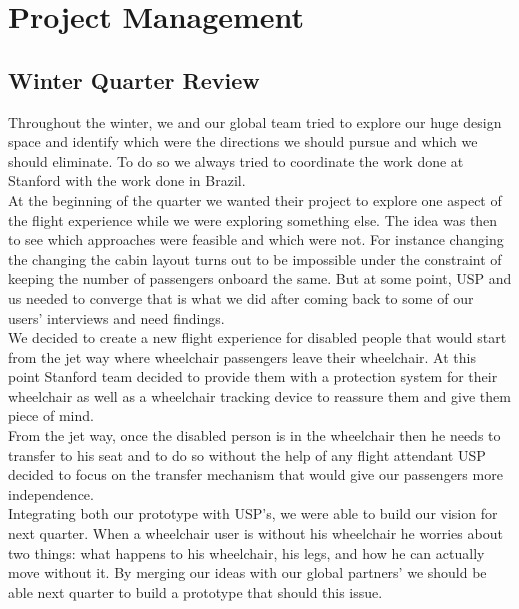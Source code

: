 \chapter{Project Management}
\label{Project_Management}

\section{Winter Quarter Review}
Throughout the winter, we and our global team tried to explore our huge design space and identify which were the directions we should pursue and which we should eliminate. To do so we always tried to coordinate the work done at Stanford with the work done in Brazil. \\

At the beginning of the quarter we wanted their project to explore one aspect of the flight experience while we were exploring something else. The idea was then to see which approaches were feasible and which were not. For instance changing the changing the cabin layout turns out to be impossible under the constraint of keeping the number of passengers onboard the same. But at some point, USP and us needed to converge that is what we did after coming back to some of our users’ interviews and need findings. \\

We decided to create a new flight experience for disabled people that would start from the jet way where wheelchair passengers leave their wheelchair. At this point Stanford team decided to provide them with a protection system for their wheelchair as well as a wheelchair tracking device to reassure them and give them piece of mind. \\

From the jet way, once the disabled person is in the wheelchair then he needs to transfer to his seat and to do so without the help of any flight attendant USP decided to focus on the transfer mechanism that would give our passengers more independence. \\

Integrating both our prototype with USP’s, we were able to build our vision for next quarter. When a wheelchair user is without his wheelchair he worries about two things: what happens to his wheelchair, his legs, and how he can actually move without it. By merging our ideas with our global partners’ we should be able next quarter to build a prototype that should this issue.


